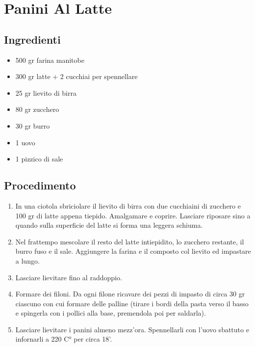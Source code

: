 \section{Panini Al Latte}
\subsection{Ingredienti}
\begin{itemize}
\item 500 gr farina manitobe   
\item 300 gr latte + 2 cucchiai per spennellare  
\item 25 gr lievito di birra  
\item 80 gr zucchero  
\item 30 gr burro  
\item 1 uovo  
\item 1 pizzico di sale
\end{itemize}
\subsection{Procedimento}
\begin{enumerate}
\item  In una ciotola sbriciolare il lievito di birra con due cucchiaini di zucchero e 100 gr di latte appena tiepido. Amalgamare e coprire. Lasciare riposare sino a quando sulla superficie del latte si forma una leggera schiuma.  
\item  Nel frattempo mescolare il resto del latte intiepidito, lo zucchero restante, il burro fuso e il sale. Aggiungere la farina e il composto col lievito ed impastare a lungo.  
\item  Lasciare lievitare fino al raddoppio.  
\item  Formare dei filoni. Da ogni filone ricavare dei pezzi di impasto di circa 30 gr ciascuno con cui formare delle palline (tirare i bordi della pasta verso il basso e spingerla con i pollici alla base, premendola poi per saldarla).   
\item  Lasciare lievitare i panini almeno mezz'ora. Spennellarli con l'uovo sbattuto e infornarli a 220 C° per circa 18'.
\end{enumerate}

